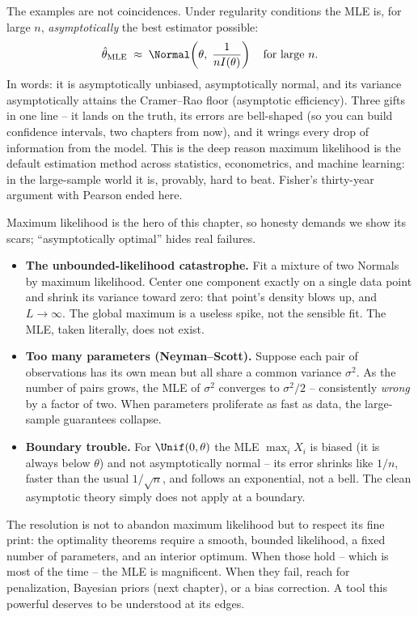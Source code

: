 \begin{aestheticbox}
The examples are not coincidences. Under regularity conditions the MLE is, for
large $n$, \emph{asymptotically} the best estimator possible:
\[
  \hat\theta_{\mathrm{MLE}} \;\approx\; \Normal\!\left(\theta,\; \frac{1}{nI(\theta)}\right)
  \quad\text{for large } n.
\]
In words: it is asymptotically unbiased, asymptotically normal, and its variance
asymptotically attains the Cramer--Rao floor (asymptotic efficiency). Three
gifts in one line -- it lands on the truth, its errors are bell-shaped (so you
can build confidence intervals, two chapters from now), and it wrings every drop
of information from the model. This is the deep reason maximum likelihood is the
default estimation method across statistics, econometrics, and machine learning:
in the large-sample world it is, provably, hard to beat. Fisher's thirty-year
argument with Pearson ended here.
\end{aestheticbox}

\begin{paradoxbox}
Maximum likelihood is the hero of this chapter, so honesty demands we show its
scars; ``asymptotically optimal'' hides real failures.
\begin{itemize}
\item \textbf{The unbounded-likelihood catastrophe.} Fit a mixture of two
  Normals by maximum likelihood. Center one component exactly on a single data
  point and shrink its variance toward zero: that point's density blows up, and
  $L\to\infty$. The global maximum is a useless spike, not the sensible fit.
  The MLE, taken literally, does not exist.
\item \textbf{Too many parameters (Neyman--Scott).} Suppose each pair of
  observations has its own mean but all share a common variance $\sigma^2$. As
  the number of pairs grows, the MLE of $\sigma^2$ converges to $\sigma^2/2$ --
  consistently \emph{wrong} by a factor of two. When parameters proliferate as
  fast as data, the large-sample guarantees collapse.
\item \textbf{Boundary trouble.} For $\Unif(0,\theta)$ the MLE $\max_i X_i$ is
  biased (it is always below $\theta$) and not asymptotically normal -- its error
  shrinks like $1/n$, faster than the usual $1/\sqrt n$, and follows an
  exponential, not a bell. The clean asymptotic theory simply does not apply at
  a boundary.
\end{itemize}
The resolution is not to abandon maximum likelihood but to respect its fine
print: the optimality theorems require a smooth, bounded likelihood, a fixed
number of parameters, and an interior optimum. When those hold -- which is most
of the time -- the MLE is magnificent. When they fail, reach for penalization,
Bayesian priors (next chapter), or a bias correction. A tool this powerful
deserves to be understood at its edges.
\end{paradoxbox}

